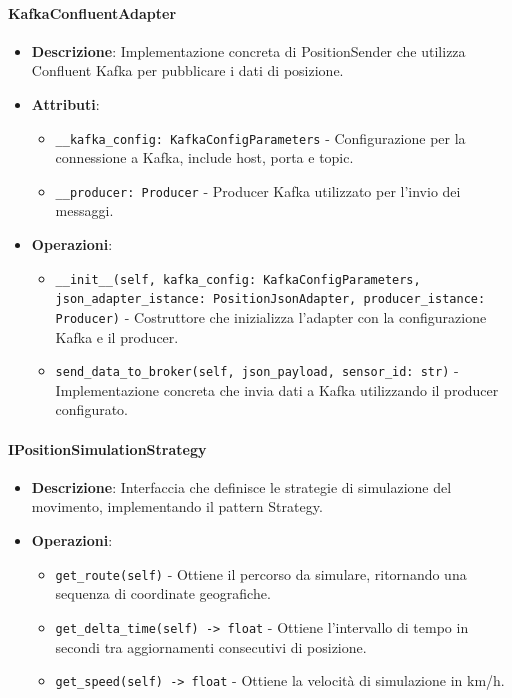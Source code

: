 \documentclass[10pt]{article}
\begin{document}
    \paragraph{KafkaConfluentAdapter}
    \begin{itemize}
        \item \textbf{Descrizione}: Implementazione concreta di PositionSender che utilizza Confluent Kafka per pubblicare i dati di posizione.
        \item \textbf{Attributi}:
        \begin{itemize}
            \item \texttt{\_\_kafka\_config: KafkaConfigParameters} - Configurazione per la connessione a Kafka, include host, porta e topic.
            \item \texttt{\_\_producer: Producer} - Producer Kafka utilizzato per l'invio dei messaggi.
        \end{itemize}
        \item \textbf{Operazioni}:
        \begin{itemize}
            \item \texttt{\_\_init\_\_(self, kafka\_config: KafkaConfigParameters, json\_adapter\_istance: PositionJsonAdapter, producer\_istance: Producer)} - Costruttore che inizializza l'adapter con la configurazione Kafka e il producer.
            \item \texttt{send\_data\_to\_broker(self, json\_payload, sensor\_id: str)} - Implementazione concreta che invia dati a Kafka utilizzando il producer configurato.
        \end{itemize}
    \end{itemize}

    \paragraph{IPositionSimulationStrategy}
    \begin{itemize}
        \item \textbf{Descrizione}: Interfaccia che definisce le strategie di simulazione del movimento, implementando il pattern Strategy.
        \item \textbf{Operazioni}:
        \begin{itemize}
            \item \texttt{get\_route(self)} - Ottiene il percorso da simulare, ritornando una sequenza di coordinate geografiche.
            \item \texttt{get\_delta\_time(self) -> float} - Ottiene l'intervallo di tempo in secondi tra aggiornamenti consecutivi di posizione.
            \item \texttt{get\_speed(self) -> float} - Ottiene la velocità di simulazione in km/h.
        \end{itemize}
    \end{itemize}
\end{document}
